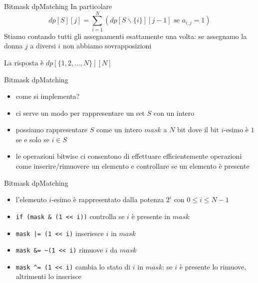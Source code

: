 \documentclass{beamer}
\begin{document}
\begin{frame}{Bitmask dp}{Matching}
    In particolare
    \[
        dp[S][j] = \sum_{i=1}^{N}{ \left( dp[S \backslash \{i\}][j-1] \text{ se } a_{i,j} = 1 \right) }
    \]
    \pause
    Stiamo contando tutti gli assegnamenti esattamente una volta: se assegnamo la donna $j$ a diversi $i$ non abbiamo sovrapposizioni
    \pause
    \bigbreak

    La risposta \`e $dp[\{1, 2, \dots, N\}][N]$
\end{frame}

\begin{frame}{Bitmask dp}{Matching}
    \begin{itemize}
        \item come si implementa?
        \pause
        \item ci serve un modo per rappresentare un set $S$ con un intero
        \pause
    \item possiamo rappresentare $S$ come un intero $mask$ a $N$ bit dove il bit $i$-esimo \`e $1$ se e solo se $i \in S$
        \pause
        \item le operazioni bitwise ci consentono di effettuare efficientemente operazioni come inserire/rimuovere un elemento e controllare se un elemento \`e presente
    \end{itemize}
\end{frame}

\begin{frame}[fragile]{Bitmask dp}{Matching}
    \begin{itemize}
        \item l'elemento $i$-esimo \`e rappresentato dalla potenza $2^i$ con $0 \leq i \leq N-1$
        \pause
    \item \verb|if (mask & (1 << i))| controlla se $i$ \`e presente in $mask$
    \item \texttt{mask |= (1 << i)} inseriesce $i$ in $mask$
    \item \verb|mask &= ~(1 << i)| rimuove $i$ da $mask$
    \item \verb|mask ^= (1 << i)| cambia lo stato di $i$ in $mask$: se $i$ \`e presente lo rimuove, altrimenti lo inserisce
    \end{itemize}
\end{frame}
\end{document}

